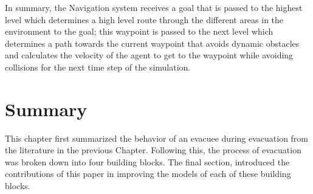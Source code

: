 In summary, the Navigation system receives a goal that is passed to the highest level which determines a high level route through the different areas in the environment to the goal; this waypoint is passed to the next level which determines a path towards the current waypoint that avoids dynamic obstacles and calculates the velocity of the agent to get to the waypoint while avoiding collisions for the next time step of the simulation.





\section{Summary}
\label{IBEVAC:Summary}


This chapter first summarized the behavior of an evacuee during evacuation from the literature in the previous Chapter. Following this, the process of evacuation was broken down into four building blocks. The final section, introduced the contributions of this paper in improving the models of each of these building blocks.